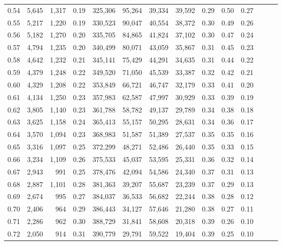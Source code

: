 \begin{tabular}{rrrrrrrrrrrrrr}
0.54 &  5,645 &  1,317 &  0.19 &  325,306 &   95,264 &  39,334 &  39,592 &  0.29 &  0.50 &      0.27 \\
0.55 &  5,217 &  1,220 &  0.19 &  330,523 &   90,047 &  40,554 &  38,372 &  0.30 &  0.49 &      0.26 \\
0.56 &  5,182 &  1,270 &  0.20 &  335,705 &   84,865 &  41,824 &  37,102 &  0.30 &  0.47 &      0.24 \\
0.57 &  4,794 &  1,235 &  0.20 &  340,499 &   80,071 &  43,059 &  35,867 &  0.31 &  0.45 &      0.23 \\
0.58 &  4,642 &  1,232 &  0.21 &  345,141 &   75,429 &  44,291 &  34,635 &  0.31 &  0.44 &      0.22 \\
0.59 &  4,379 &  1,248 &  0.22 &  349,520 &   71,050 &  45,539 &  33,387 &  0.32 &  0.42 &      0.21 \\
0.60 &  4,329 &  1,208 &  0.22 &  353,849 &   66,721 &  46,747 &  32,179 &  0.33 &  0.41 &      0.20 \\
0.61 &  4,134 &  1,250 &  0.23 &  357,983 &   62,587 &  47,997 &  30,929 &  0.33 &  0.39 &      0.19 \\
0.62 &  3,805 &  1,140 &  0.23 &  361,788 &   58,782 &  49,137 &  29,789 &  0.34 &  0.38 &      0.18 \\
0.63 &  3,625 &  1,158 &  0.24 &  365,413 &   55,157 &  50,295 &  28,631 &  0.34 &  0.36 &      0.17 \\
0.64 &  3,570 &  1,094 &  0.23 &  368,983 &   51,587 &  51,389 &  27,537 &  0.35 &  0.35 &      0.16 \\
0.65 &  3,316 &  1,097 &  0.25 &  372,299 &   48,271 &  52,486 &  26,440 &  0.35 &  0.33 &      0.15 \\
0.66 &  3,234 &  1,109 &  0.26 &  375,533 &   45,037 &  53,595 &  25,331 &  0.36 &  0.32 &      0.14 \\
0.67 &  2,943 &    991 &  0.25 &  378,476 &   42,094 &  54,586 &  24,340 &  0.37 &  0.31 &      0.13 \\
0.68 &  2,887 &  1,101 &  0.28 &  381,363 &   39,207 &  55,687 &  23,239 &  0.37 &  0.29 &      0.13 \\
0.69 &  2,674 &    995 &  0.27 &  384,037 &   36,533 &  56,682 &  22,244 &  0.38 &  0.28 &      0.12 \\
0.70 &  2,406 &    964 &  0.29 &  386,443 &   34,127 &  57,646 &  21,280 &  0.38 &  0.27 &      0.11 \\
0.71 &  2,286 &    962 &  0.30 &  388,729 &   31,841 &  58,608 &  20,318 &  0.39 &  0.26 &      0.10 \\
0.72 &  2,050 &    914 &  0.31 &  390,779 &   29,791 &  59,522 &  19,404 &  0.39 &  0.25 &      0.10 \\

\end{tabular}
